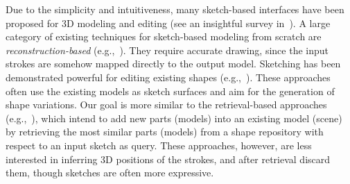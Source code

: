 Due to the simplicity and intuitiveness, many sketch-based interfaces have been proposed for 3D modeling and editing (see an insightful survey in~\cite{olsen2009sketch}). A large category of existing techniques for sketch-based modeling from scratch are \emph{reconstruction-based} (e.g.,~\cite{Zeleznik:1996,Igarashi:1999,Karpenko:2006,nealen2007fibermesh}). They require accurate drawing, since the input strokes are somehow mapped directly to the output model. Sketching has been demonstrated powerful for editing existing shapes (e.g.,~\cite{singh1998wires,nealen:2005:sketch,Olsen:2005,Kara2006a}).
These approaches often use the existing models as sketch surfaces and aim for the generation of shape variations. Our goal is more similar to the retrieval-based approaches (e.g.,~\cite{Shin:2007,Lee:2008b,Xu:2013,Fan2013}), which intend to add new parts (models) into an existing model (scene) by retrieving the most similar parts (models) from a shape repository with respect to an input sketch as query. These approaches, however, are less interested in inferring 3D positions of the strokes, and after retrieval discard them, though sketches are often more expressive.
%





